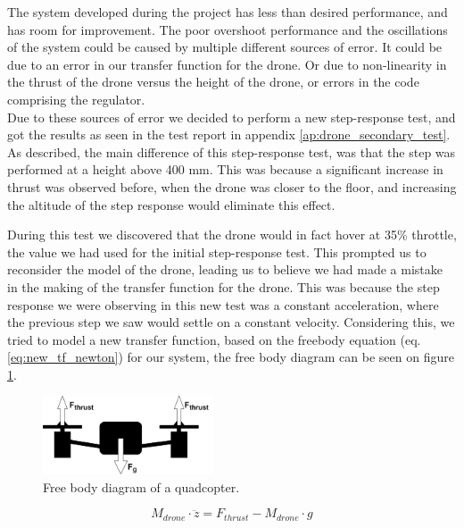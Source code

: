 The system developed during the project has less than desired performance, and has room for improvement. The poor overshoot performance and the oscillations of the system could be caused by multiple different sources of error. It could be due to an error in our transfer function for the drone. Or due to non-linearity in the thrust of the drone versus the height of the drone, or errors in the code comprising the regulator.\\
Due to these sources of error we decided to perform a new step-response test, and got the results as seen in the test report in appendix \ref{ap:drone_secondary_test}.
As described, the main difference of this step-response test, was that the step was performed at a height above 400 mm. This was because a significant increase in thrust was observed before, when the drone was closer to the floor, and increasing the altitude of the step response would eliminate this effect.


During this test we discovered that the drone would in fact hover at 35\% throttle, the value we had used for the initial step-response test.
This prompted us to reconsider the model of the drone, leading us to believe we had made a mistake in the making of the transfer function for the drone. This was because the step response we were observing in this new test was a constant acceleration, where the previous step we saw would settle on a constant velocity.
Considering this, we tried to model a new transfer function, based on the freebody equation (eq. \ref{eq:new_tf_newton}) for our system, the free body diagram can be seen on figure \ref{fig:Dis_QC_freeBodyDiagram}. 

\begin{figure}[H]
    \centering
    \includegraphics[width=0.45\textwidth]{figures/ch_intro/droen_frit_legeme-diagram.png}
    \caption{Free body diagram of a quadcopter.}
    \label{fig:Dis_QC_freeBodyDiagram}
\end{figure}

\begin{equation} \label{eq:new_tf_newton}
    M_{drone} \cdot \ddot{z} = F_{thrust} - M_{drone} \cdot g
\end{equation}

